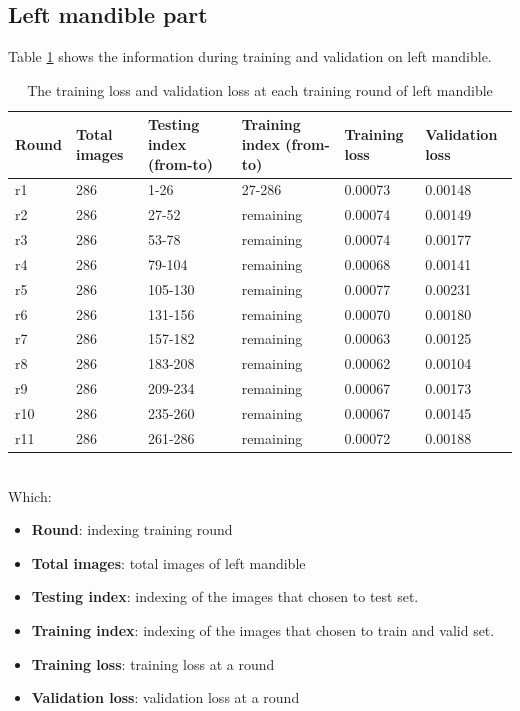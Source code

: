 \documentclass[12pt,a4paper]{article}
\begin{document}
\subsection{Left mandible part}
Table \ref{mgloss} shows the information during training and validation on left mandible.
\begin{table}[h!]
	\centering
	\begin{tabular}{l p{2cm} p{2.4cm} p{2.6cm} p{2.2cm} p{2.2cm}}
	Round & Total images & Testing index (from-to) & Training index (from-to) & Training loss & Validation loss \\ \hline
	r1 & 286 & 1-26 & 27-286 & 0.00073 & 0.00148 \\ \hline
	r2 & 286 & 27-52 & remaining & 0.00074 & 0.00149 \\ \hline
	r3 & 286 & 53-78 & remaining & 0.00074 & 0.00177 \\ \hline
	r4 & 286 & 79-104 & remaining & 0.00068 & 0.00141 \\ \hline
	r5 & 286 & 105-130 & remaining & 0.00077 & 0.00231 \\ \hline
	r6 & 286 & 131-156 & remaining & 0.00070 & 0.00180 \\ \hline
	r7 & 286 & 157-182 & remaining & 0.00063 & 0.00125 \\ \hline
	r8 & 286 & 183-208 & remaining & 0.00062 & 0.00104 \\ \hline
	r9 & 286 & 209-234 & remaining & 0.00067 & 0.00173 \\ \hline	
	r10 & 286 & 235-260 & remaining & 0.00067 & 0.00145 \\ \hline
	r11 & 286 & 261-286 & remaining & 0.00072 & 0.00188 \\ \hline
	\end{tabular}
	\caption{The training loss and validation loss at each training round of left mandible}
	\label{mgloss}
\end{table}~\\
Which:
\begin{itemize}
	\item \textbf{Round}: indexing training round
	\item \textbf{Total images}: total images of left mandible
	\item \textbf{Testing index}: indexing of the images that chosen to test set.
	\item \textbf{Training index}: indexing of the images that chosen to train and valid set.
	\item \textbf{Training loss}: training loss at a round
	\item \textbf{Validation loss}: validation loss at a round
\end{itemize}~\\
\end{document}
